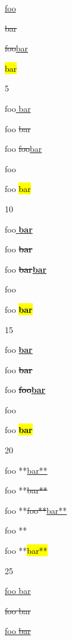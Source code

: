 
\def\mytitle{CriticMarkup}


\underline{foo}

\sout{bar}

\sout{foo}\underline{bar}


\hl{bar}

5

foo\underline{ bar}

foo\sout{ bar}

foo \sout{foo}\underline{bar}

foo 

foo \hl{bar}

10

foo\underline{ \textbf{bar}}

foo\sout{ \textbf{bar}}

foo \sout{\textbf{bar}}\underline{\textbf{bar}}

foo 

foo \hl{\textbf{bar}}

15

foo \textbf{\underline{bar}}

foo \textbf{\sout{bar}}

foo \textbf{\sout{foo}\underline{bar}}

foo \textbf{}

foo \textbf{\hl{bar}}

20

foo **\underline{bar**}

foo **\sout{bar**}

foo **\sout{foo**}\underline{bar**}

foo **

foo **\hl{bar**}

25

\underline{foo\underline{ bar}}

\sout{foo\sout{ bar}}

\underline{foo\sout{ bar}}




